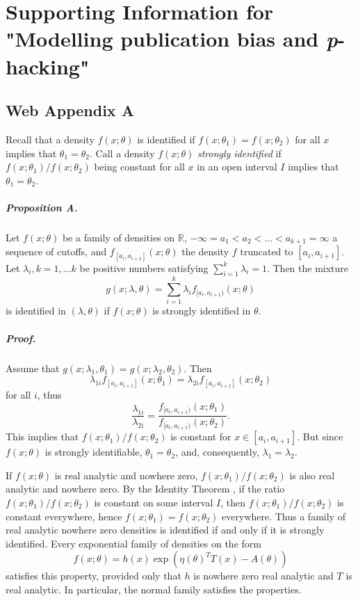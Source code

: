 \chapter{Supporting Information for "Modelling publication bias and \textit{p}-hacking"}

\section*{Web Appendix A}

Recall that a density $f(x;\theta)$ is identified if $f(x;\theta_{1})=f(x;\theta_{2})$
for all $x$ implies that $\theta_{1}=\theta_{2}.$ Call a density
$f(x;\theta)$ \textit{strongly identified} if $f(x;\theta_{1})/f(x;\theta_{2})$
being constant for all $x$ in an open interval $I$ implies that
$\theta_{1}=\theta_{2}$.
\paragraph{Proposition A.}\label{prop:identified}

Let $f(x;\theta)$ be a family of densities on $\mathbb{R}$, $-\infty=a_{1}<a_{2}<\ldots<a_{k+1}=\infty$
a sequence of cutoffs, and $f_{[a_{i},a_{i+1}]}(x;\theta)$ the density
$f$ truncated to $[a_{i},a_{i+1}]$. Let $\lambda_{i},k=1,\ldots k$
be positive numbers satisfying $\sum_{i=1}^{k}\lambda_{i}=1$. Then
the mixture
\[
g(x;\lambda,\theta)=\sum_{i=1}^{k}\lambda_{i}f_{[a_{i},a_{i+1})}(x;\theta)
\]
is identified in $(\lambda,\theta)$ if $f(x;\theta)$ is strongly
identified in $\theta$.

\paragraph{Proof.}
Assume that $g(x;\lambda_{1},\theta_{1})=g(x;\lambda_{2},\theta_{2})$.
Then $$\lambda_{1i}f_{[a_{i},a_{i+1}]}(x;\theta_{1})=\lambda_{2i}f_{[a_{i},a_{i+1}]}(x;\theta_{2})$$
for all $i$, thus
\[
\frac{\lambda_{1i}}{\lambda_{2i}}=\frac{f_{[a_{i},a_{i+1})}(x;\theta_{1})}{f_{[a_{i},a_{i+1})}(x;\theta_{2})}.
\]
This implies that $f(x;\theta_{1})/f(x;\theta_{2})$ is constant for
$x\in[a_{i},a_{i+1}]$. But since $f(x;\theta)$ is strongly identifiable,
$\theta_{1}=\theta_{2}$, and, consequently, $\lambda_1 = \lambda_2$.


If $f(x;\theta)$ is real analytic and nowhere zero, $f(x;\theta_{1})/f(x;\theta_{2})$
is also real analytic and nowhere zero. By the Identity Theorem \parencite[Corollary 1.2.6]{Krantz2002-bt}, if the ratio
$f(x;\theta_{1})/f(x;\theta_{2})$ is constant on some interval $I$,
then $f(x;\theta_{1})/f(x;\theta_{2})$ is constant everywhere, hence
$f(x;\theta_{1})=f(x;\theta_{2})$ everywhere. Thus a family of real
analytic nowhere zero densities is identified if and only if it is
strongly identified. Every exponential family of densities on the form
\[
f(x;\theta)=h(x)\exp(\eta(\theta)^{T}T(x)-A(\theta))
\]
satisfies this property, provided only that $h$ is nowhere zero real analytic
and $T$ is real analytic. In particular, the normal family satisfies
the properties.

